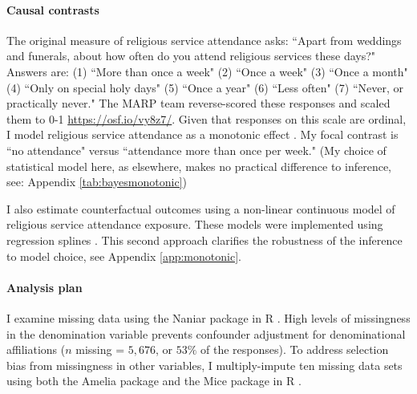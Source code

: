 \documentclass[]{interact}
\theoremstyle{plain}%
\theoremstyle{definition}
\theoremstyle{remark}
\begin{document}
\paragraph*{Causal contrasts} The original measure of religious service attendance asks: “Apart from weddings and funerals, about how often do you attend religious services these days?" Answers are: (1) “More than once a week" (2) “Once a week" (3) “Once a month" (4) “Only on special holy days" (5) “Once a year" (6) “Less often" (7) “Never, or practically never." The MARP team reverse-scored these responses and scaled them to 0-1 \href{https://osf.io/vy8z7/}{https://osf.io/vy8z7/}. Given that responses on this scale are ordinal, I model religious service attendance as a monotonic effect \citep{burkner_bayesian_2021}. 
My focal contrast is “no attendance" versus “attendance more than once per week."  (My choice of statistical model here, as elsewhere, makes no practical difference to inference, see: Appendix \ref{tab:bayesmonotonic})

I also estimate counterfactual outcomes using a non-linear continuous model of religious service attendance exposure. These models were implemented using regression splines \citep{r_core_team_r_2021}. 
This second approach clarifies the robustness of the inference to model choice, see Appendix \ref{app:monotonic}. 

\paragraph*{Analysis plan} I examine missing data using the Naniar package \citep{tierney_naniar_2021} 
in R \citep{r_core_team_r_2021}. 
High levels of missingness in the denomination variable prevents confounder adjustment for denominational affiliations ($n$ missing = $5,676$, or $53\%$ of the responses). To address selection bias from missingness in other variables, I multiply-impute ten missing data sets using both the Amelia package \citep{honaker_amelia_2011} 
and the Mice package \citep{buuren_mice_2011}
in R \citep{r_core_team_r_2021}. 
\end{document}
